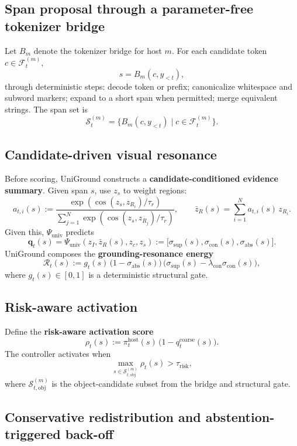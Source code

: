 \subsection{Span proposal through a parameter-free tokenizer bridge}

Let $B_m$ denote the tokenizer bridge for host $m$. For each candidate token $c \in \mathcal{F}_t^{(m)}$,
\[
s = B_m(c, y_{<t}),
\]
through deterministic steps: decode token or prefix; canonicalize whitespace and subword markers; expand to a short span when permitted; merge equivalent strings. The span set is
\[
\mathcal{S}_t^{(m)} = \{ B_m(c, y_{<t}) \mid c \in \mathcal{F}_t^{(m)} \}.
\]

\subsection{Candidate-driven visual resonance}

Before scoring, UniGround constructs a \textbf{candidate-conditioned evidence summary}. Given span $s$, use $z_s$ to weight regions:
\[
a_{t,i}(s)
:=
\frac{\exp(\cos(z_s, z_{R_i}) / \tau_r)}
{\sum_{j=1}^{N} \exp(\cos(z_s, z_{R_j}) / \tau_r)},
\qquad
\bar z_R(s) = \sum_{i=1}^{N} a_{t,i}(s)\, z_{R_i}.
\]
Given this, $\Psi_{\mathrm{univ}}$ predicts
\[
\mathbf{q}_t(s) = \Psi_{\mathrm{univ}}(z_I, \bar z_R(s), z_c, z_s)
:= \big[\sigma_{\mathrm{sup}}(s), \sigma_{\mathrm{con}}(s), \sigma_{\mathrm{abs}}(s)\big].
\]
UniGround composes the \textbf{grounding-resonance energy}
\[
\mathcal{R}_t(s)
:= g_t(s)\,\big(1-\sigma_{\mathrm{abs}}(s)\big)\,
\big(\sigma_{\mathrm{sup}}(s) - \lambda_{\mathrm{con}}\sigma_{\mathrm{con}}(s)\big),
\]
where $g_t(s) \in [0,1]$ is a deterministic structural gate.

\subsection{Risk-aware activation}

Define the \textbf{risk-aware activation score}
\[
\rho_t(s)
:=
\pi_t^{\mathrm{host}}(s)\,\bigl(1-q_t^{\mathrm{coarse}}(s)\bigr).
\]
The controller activates when
\[
\max_{s \in \mathcal{S}_{t,\mathrm{obj}}^{(m)}} \rho_t(s) > \tau_{\mathrm{risk}},
\]
where $\mathcal{S}_{t,\mathrm{obj}}^{(m)}$ is the object-candidate subset from the bridge and structural gate.

\subsection{Conservative redistribution and abstention-triggered back-off}

